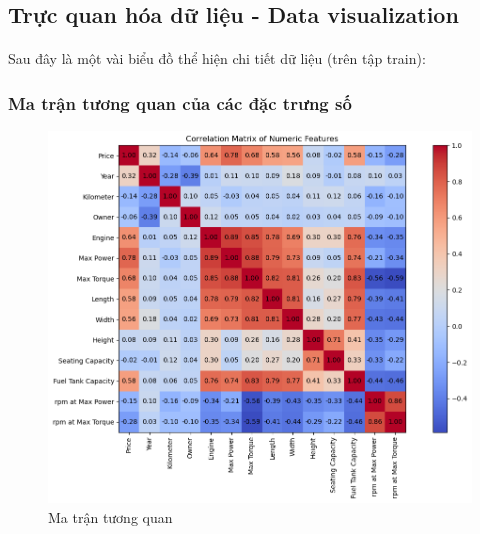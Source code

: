 \newpage
\subsection{Trực quan hóa dữ liệu - Data visualization}

\paragraph{}{Sau đây là một vài biểu đồ thể hiện chi tiết dữ liệu (trên tập train):}

\subsubsection{Ma trận tương quan của các đặc trưng số}
\begin{figure}[H]
    \centering
    \includegraphics[width=1\linewidth]{img/corr-matrix-1.png}
    \caption{Ma trận tương quan}
    \label{fig:corr-matrix-1}
\end{figure}

